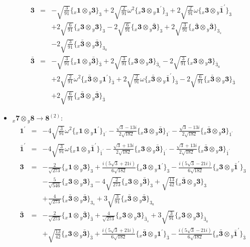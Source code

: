 \documentclass[english]{article}
\newcommand{\rep}[1]{\mathbf{#1}}
\newcommand{\repx}[2]{{}_{#2}\mathbf{#1}}
\newcommand{\subcg}[3]{\big\{ \repx{#1}{x}\otimes\repx{#2}{y}\big\}^{}_{#3}}
\begin{document}
\begin{itemize}
\begin{eqnarray*}
\\
\rep{3} &=& -\sqrt{\frac{3}{91}}\subcg{1}{3}{3}+2 \sqrt{\frac{2}{91}} \omega ^2\subcg{3}{1^{\prime}}{3}+2 \sqrt{\frac{2}{91}} \omega\subcg{3}{\bar{1}^{\prime}}{3} \\ 
 & & +2 \sqrt{\frac{6}{91}}\subcg{3}{3}{3}-2 \sqrt{\frac{6}{91}}\subcg{3}{\bar{3}}{3}+2 \sqrt{\frac{3}{91}}\subcg{\bar{3}}{\bar{3}}{3_{s}} \\ 
 & & -2 \sqrt{\frac{3}{91}}\subcg{\bar{3}}{\bar{3}}{3_{a}}
\\
\rep{\bar{3}} &=& -\sqrt{\frac{3}{91}}\subcg{1}{\bar{3}}{\bar{3}}+2 \sqrt{\frac{3}{91}}\subcg{3}{3}{\bar{3}_{s}}-2 \sqrt{\frac{3}{91}}\subcg{3}{3}{\bar{3}_{a}} \\ 
 & & +2 \sqrt{\frac{2}{91}} \omega ^2\subcg{\bar{3}}{1^{\prime}}{\bar{3}}+2 \sqrt{\frac{2}{91}} \omega\subcg{\bar{3}}{\bar{1}^{\prime}}{\bar{3}}-2 \sqrt{\frac{6}{91}}\subcg{\bar{3}}{3}{\bar{3}} \\ 
 & & +2 \sqrt{\frac{6}{91}}\subcg{\bar{3}}{\bar{3}}{\bar{3}}
\end{eqnarray*}
\item $\repx{7}{x}\otimes\repx{8}{y}\to\rep{8}^{(2)}$:
\begin{eqnarray*}
\rep{1^{\prime}} &=& -4 \sqrt{\frac{3}{91}} \omega ^2\subcg{1}{1^{\prime}}{1^{\prime}}-\frac{\sqrt{3}-13 i}{2 \sqrt{182}}\subcg{3}{\bar{3}}{1^{\prime}}-\frac{\sqrt{3}-13 i}{2 \sqrt{182}}\subcg{\bar{3}}{3}{1^{\prime}}
\\
\rep{\bar{1}^{\prime}} &=& -4 \sqrt{\frac{3}{91}} \omega\subcg{1}{\bar{1}^{\prime}}{\bar{1}^{\prime}}-\frac{\sqrt{3}+13 i}{2 \sqrt{182}}\subcg{3}{\bar{3}}{\bar{1}^{\prime}}-\frac{\sqrt{3}+13 i}{2 \sqrt{182}}\subcg{\bar{3}}{3}{\bar{1}^{\prime}}
\\
\rep{3} &=& -\frac{2}{\sqrt{273}}\subcg{1}{3}{3}+\frac{i \left(5 \sqrt{3}+21 i\right)}{6 \sqrt{182}}\subcg{3}{1^{\prime}}{3}-\frac{i \left(5 \sqrt{3}-21 i\right)}{6 \sqrt{182}}\subcg{3}{\bar{1}^{\prime}}{3} \\ 
 & & -\frac{5}{\sqrt{546}}\subcg{3}{3}{3}-4 \sqrt{\frac{2}{273}}\subcg{3}{\bar{3}}{3}+\sqrt{\frac{13}{42}}\subcg{\bar{3}}{3}{3} \\ 
 & & +\frac{4}{\sqrt{273}}\subcg{\bar{3}}{\bar{3}}{3_{s}}+3 \sqrt{\frac{3}{91}}\subcg{\bar{3}}{\bar{3}}{3_{a}}
\\
\rep{\bar{3}} &=& -\frac{2}{\sqrt{273}}\subcg{1}{\bar{3}}{\bar{3}}+\frac{4}{\sqrt{273}}\subcg{3}{3}{\bar{3}_{s}}+3 \sqrt{\frac{3}{91}}\subcg{3}{3}{\bar{3}_{a}} \\ 
 & & +\sqrt{\frac{13}{42}}\subcg{3}{\bar{3}}{\bar{3}}+\frac{i \left(5 \sqrt{3}+21 i\right)}{6 \sqrt{182}}\subcg{\bar{3}}{1^{\prime}}{\bar{3}}-\frac{i \left(5 \sqrt{3}-21 i\right)}{6 \sqrt{182}}\subcg{\bar{3}}{\bar{1}^{\prime}}{\bar{3}} \\ 

\end{eqnarray*}
\end{itemize}
\end{document}
